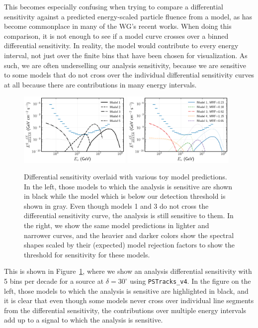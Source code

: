 \documentclass[a4paper,11pt]{article}
\begin{document}
This becomes especially confusing when trying to compare a differential sensitivity against a predicted energy-scaled particle fluence from a model, as has become commonplace in many of the WG's recent works. When doing this comparison, it is not enough to see if a model curve crosses over a binned differential sensitivity. In reality, the model would contribute to every energy interval, not just over the finite bins that have been chosen for visualization. As such, we are often underselling our analysis sensitivity, because we are sensitive to some models that do not cross over the individual differential sensitivity curves at all because there are contributions in many energy intervals. 

\begin{figure}
    \centering
    \includegraphics[width=0.48\textwidth]{figures/differential_highlighted_sensitive.png}
    \includegraphics[width=0.48\textwidth]{figures/differential_with_mrf.png}
    \caption{Differential sensitivity overlaid with various toy model predictions. In the left, those models to which the analysis is sensitive are shown in black while the model which is below our detection threshold is shown in gray. Even though models 1 and 3 do not cross the differential sensitivity curve, the analysis is still sensitive to them. In the right, we show the same model predictions in lighter and narrower curves, and the heavier and darker colors show the spectral shapes scaled by their (expected) model rejection factors to show the threshold for sensitivity for these models.}
    \label{fig:diff_sens_mrf}
\end{figure}

This is shown in Figure~\ref{fig:diff_sens_mrf}, where we show an analysis differential sensitivity with 5 bins per decade for a source at $\delta=30^{\circ}$ using \texttt{PSTracks\_v4}. In the figure on the left, those models to which the analysis is sensitive are highlighted in black, and it is clear that even though some models never cross over individual line segments from the differential sensitivity, the contributions over multiple energy intervals add up to a signal to which the analysis is sensitive. 
\end{document}
